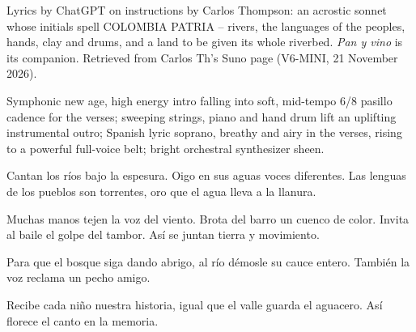 \begin{notes}
Lyrics by ChatGPT on instructions by Carlos Thompson: an acrostic sonnet whose initials spell COLOMBIA PATRIA -- rivers, the languages of the peoples, hands, clay and drums, and a land to be given its whole riverbed. \emph{Pan y vino} is its companion. Retrieved from Carlos Th's Suno page (V6-MINI, 21 November 2026).
\end{notes}
\begin{style}
Symphonic new age, high energy intro falling into soft, mid-tempo 6/8 pasillo cadence for the verses; sweeping strings, piano and hand drum lift an uplifting instrumental outro; Spanish lyric soprano, breathy and airy in the verses, rising to a powerful full-voice belt; bright orchestral synthesizer sheen.
\end{style}
\begin{lyrics}
Cantan los ríos bajo la espesura.
Oigo en sus aguas voces diferentes.
Las lenguas de los pueblos son torrentes,
oro que el agua lleva a la llanura.

Muchas manos tejen la voz del viento.
Brota del barro un cuenco de color.
Invita al baile el golpe del tambor.
Así se juntan tierra y movimiento.

Para que el bosque siga dando abrigo,
al río démosle su cauce entero.
También la voz reclama un pecho amigo.

Recibe cada niño nuestra historia,
igual que el valle guarda el aguacero.
Así florece el canto en la memoria.
\end{lyrics}


